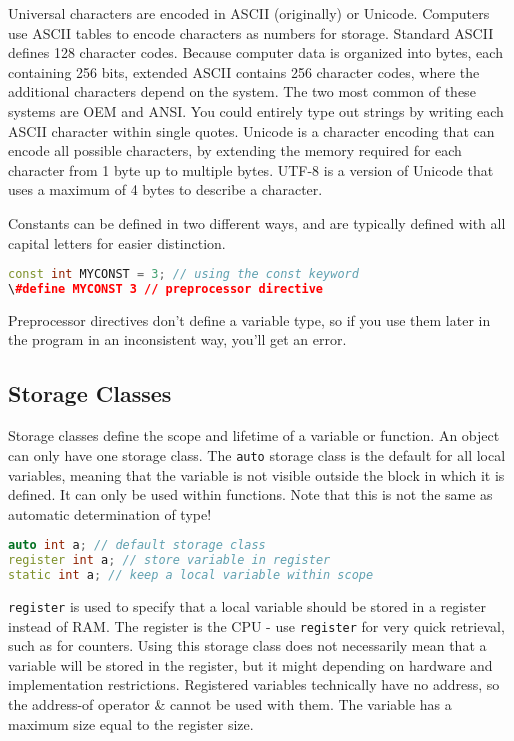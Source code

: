\documentclass[10pt]{article}
\begin{document}
Universal characters are encoded in ASCII (originally) or Unicode. Computers use ASCII tables to encode characters as numbers for storage. Standard ASCII defines 128 character codes. Because computer data is organized into bytes, each containing 256 bits, extended ASCII contains 256 character codes, where the additional characters depend on the system. The two most common of these systems are OEM and ANSI. You could entirely type out strings by writing each ASCII character within single quotes. Unicode is a character encoding that can encode all possible characters, by extending the memory required for each character from 1 byte up to multiple bytes. UTF-8 is a version of Unicode that uses a maximum of 4 bytes to describe a character. 

Constants can be defined in two different ways, and are typically defined with all capital letters for easier distinction.

\begin{lstlisting}[language=C++]
const int MYCONST = 3; // using the const keyword
\#define MYCONST 3 // preprocessor directive
\end{lstlisting}

Preprocessor directives don't define a variable type, so if you use them later in the program in an inconsistent way, you'll get an error. 

\subsection{Storage Classes}

Storage classes define the scope and lifetime of a variable or function. An object can only have one storage class. The \texttt{auto} storage class is the default for all local variables, meaning that the variable is not visible outside the block in which it is defined. It can only be used within functions. Note that this is not the same as automatic determination of type!

\begin{lstlisting}[language=C++]
auto int a; // default storage class
register int a; // store variable in register
static int a; // keep a local variable within scope
\end{lstlisting}

\texttt{register} is used to specify that a local variable should be stored in a register instead of RAM. The register is the CPU - use \texttt{register} for very quick retrieval, such as for counters. Using this storage class does not necessarily mean that a variable will be stored in the register, but it might depending on hardware and implementation restrictions. Registered variables technically have no address, so the address-of operator \& cannot be used with them. The variable has a maximum size equal to the register size.
\end{document}
